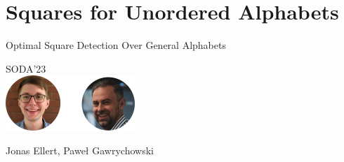 
\section{Squares for Unordered Alphabets}
\newcommand{\absolute}[1]{\left\lvert#1\right\rvert}
\newcommand{\orderof}[1]{\mathcal{O}(#1)}

\begin{frame}
    \centering
    {\Large Optimal Square Detection  Over General Alphabets}
  
    \bigskip
    {\large SODA'23}\\
    \bigskip
    \includegraphics{pictures/mindmap/squares.png}
  
    \bigskip
    Jonas Ellert, Paweł Gawrychowski
\end{frame}




